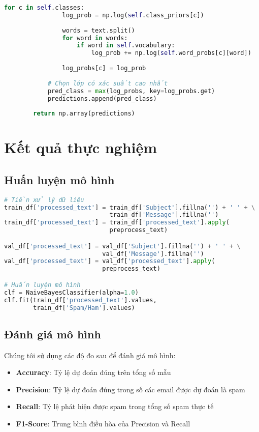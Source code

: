 \begin{lstlisting}[language=Python]
            for c in self.classes:
                log_prob = np.log(self.class_priors[c])
                
                words = text.split()
                for word in words:
                    if word in self.vocabulary:
                        log_prob += np.log(self.word_probs[c][word])
                
                log_probs[c] = log_prob
            
            # Chọn lớp có xác suất cao nhất
            pred_class = max(log_probs, key=log_probs.get)
            predictions.append(pred_class)
            
        return np.array(predictions)
\end{lstlisting}

\section{Kết quả thực nghiệm}

\subsection{Huấn luyện mô hình}

\begin{lstlisting}[language=Python]
# Tiền xử lý dữ liệu
train_df['processed_text'] = train_df['Subject'].fillna('') + ' ' + \
                             train_df['Message'].fillna('')
train_df['processed_text'] = train_df['processed_text'].apply(
                             preprocess_text)

val_df['processed_text'] = val_df['Subject'].fillna('') + ' ' + \
                           val_df['Message'].fillna('')
val_df['processed_text'] = val_df['processed_text'].apply(
                           preprocess_text)

# Huấn luyện mô hình
clf = NaiveBayesClassifier(alpha=1.0)
clf.fit(train_df['processed_text'].values, 
        train_df['Spam/Ham'].values)
\end{lstlisting}

\subsection{Đánh giá mô hình}

Chúng tôi sử dụng các độ đo sau để đánh giá mô hình:

\begin{itemize}
    \item \textbf{Accuracy}: Tỷ lệ dự đoán đúng trên tổng số mẫu
    \item \textbf{Precision}: Tỷ lệ dự đoán đúng trong số các email được dự đoán là spam
    \item \textbf{Recall}: Tỷ lệ phát hiện được spam trong tổng số spam thực tế
    \item \textbf{F1-Score}: Trung bình điều hòa của Precision và Recall
\end{itemize}

